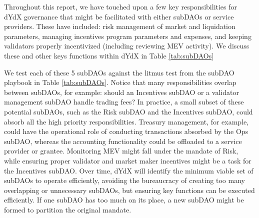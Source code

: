             Throughout this report, we have touched upon a few key responsibilities for dYdX governance that might be facilitated with either subDAOs or service providers. These have included: risk management of market and liquidation parameters, managing incentives program parameters and expenses, and keeping validators properly incentivized (including reviewing MEV activity). We discuss these and other keys functions within dYdX in Table \ref{tab:subDAOs}
    
            We test each of these 5 subDAOs against the litmus test from the subDAO playbook in Table \ref{tab:subDAOs}. Notice that many responsibilities overlap between subDAOs, for example: should an Incentives subDAO or a validator management subDAO handle trading fees? In practice, a small subset of these potential subDAOs, such as the Risk subDAO and the Incentives subDAO, could absorb all the high priority responsibilities. Treasury management, for example, could have the operational role of conducting transactions absorbed by the Ops subDAO, whereas the accounting functionality could be offloaded to a service provider or grantee. Monitoring MEV might fall under the mandate of Risk, while ensuring proper validator and market maker incentives might be a task for the Incentives subDAO. Over time, dYdX will identify the minimum viable set of subDAOs to operate efficiently, avoiding the bureaucracy of creating too many overlapping or unnecessary subDAOs, but ensuring key functions can be executed efficiently. If one subDAO has too much on its place, a new subDAO might be formed to partition the original mandate.
    
